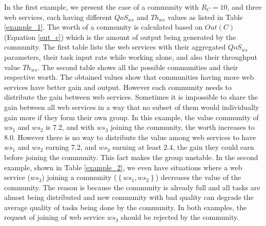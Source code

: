 \documentclass[10pt,journal,cspaper,compsoc]{IEEEtran}
\begin{document}
In the first example,  we present the case of a community with
$R_C =10 $, and three web services, each having different
$QoS_{ws}$ and $Th_{ws}$ values as listed in Table
\ref{example_1}. The worth of a community is calculated based on
$Out(C)$ (Equation \ref{out_c}) which is the amount of output
being generated by the community. The first table  lists the web
services with their aggregated $QoS_{ws}$ parameters, their task
input rate while working alone, and also their  throughput value
$Th_{ws}$. The second table shows all the possible communities and
their respective worth. The obtained values show that communities
having more web services have better gain and output. However each
community needs to  distribute the gain between web services.
Sometimes it is impossible to share the gain between all web
services in a way that no subset of them would individually gain
more if they form their own group. In this example, the value
community of ${ws_1}$ and ${ws_2}$ is 7.2, and with ${ws_3}$
joining the community, the worth increases to 8.0. However there
is no way to distribute the value among web services to have
${ws_1}$ and ${ws_2}$  earning 7.2, and ${ws_3}$ earning at least
2.4, the gain they could earn before joining the community. This
fact makes the group unstable. In the second  example, shown in
Table \ref{example_2}, we even have situations where a web service
(${ws_3}$) joining a community ($\left\{ws_1,ws_2\right\}$)
decreases the value of the community. The reason is because the
community is already full and all tasks are almost being
distributed and new community with bad quality can degrade the
average quality of tasks being done by the community. In both
examples, the request of joining of web service ${ws_3}$ should be
rejected by the community.
\end{document}
